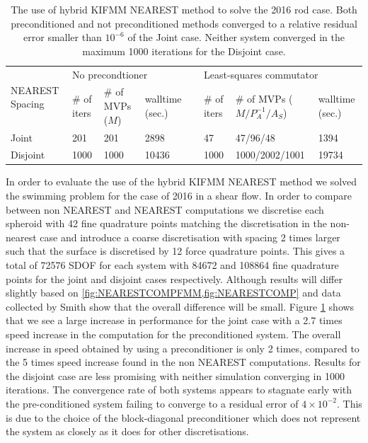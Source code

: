 \begin{table}
\begin{singlespace}
\centering
\setlength{\tabcolsep}{6pt}
\renewcommand{\arraystretch}{1.4}
\caption[The use of hybrid KIFMM NEAREST method to solve the 2016 rod case.]{The use of hybrid KIFMM NEAREST method to solve the 2016 rod case. Both preconditioned and not preconditioned methods converged to a relative residual error smaller than $10^{-6}$ of the Joint case. Neither system converged in the maximum 1000 iterations for the Disjoint case.}
\small
\begin{tabular}{p{2cm} p{0.75cm} p{2cm} p{1.0cm} p{0.1cm} p{0.75cm} p{2.5cm} p{1.5cm}}
\multirow{2}{*}{\parbox{1.8cm}{NEAREST Spacing}} & \multicolumn{3}{l}{No precondtioner} & & \multicolumn{3}{l}{Least-squares commutator} \\ \cline{2-4} \cline{6-8}
  & \# of iters & \# of MVPs ($M$) & walltime (sec.) & & \# of iters & \# of MVPs ($M/P_A^{-1}/A_S$) & walltime (sec.) \\ \hline
  Joint & 201 & 201 & 2898 & &  47 & 47/96/48 & 1394\\
  Disjoint & 1000 & 1000 & 10436 & & 1000 & 1000/2002/1001 & 19734
\end{tabular}
\label{tab:PreconditioningNear}
\end{singlespace}
\end{table}

In order to evaluate the use of the hybrid KIFMM NEAREST method we solved the swimming problem for the case of 2016 in a shear flow. In order to compare between non NEAREST and NEAREST computations we discretise each spheroid with 42 fine quadrature points matching the discretisation in the non-nearest case and introduce a coarse discretisation with spacing 2 times larger such that the surface is discretised by 12 force quadrature points.  This gives a total of 72576 SDOF for each system with 84672 and 108864 fine quadrature points for the joint and disjoint cases respectively. Although results will differ slightly based on \cref{fig:NEARESTCOMPFMM,fig:NEARESTCOMP} and data collected by Smith \cite{Smith2018AEquation} show that the overall difference will be small. Figure \ref{tab:PreconditioningNear} shows that we see a large increase in performance for the joint case with a 2.7 times speed increase in the computation for the preconditioned system. The overall increase in speed obtained by using a preconditioner is only 2 times, compared to the 5 times speed increase found in the non NEAREST computations. Results for the disjoint case are less promising with neither simulation converging in 1000 iterations. The convergence rate of both systems appears to stagnate early with the pre-conditioned system failing to converge to a residual error of $4\times 10^{-2}$. This is due to the choice of the block-diagonal preconditioner which does not represent the system as closely as it does for other discretisations. 

